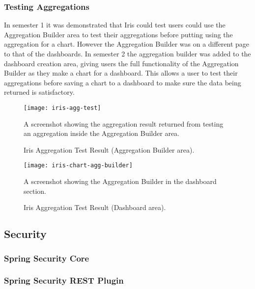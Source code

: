 \documentclass[12pt,a4paper,titlepage]{report}
\begin{document}
\subsubsection{Testing Aggregations}
In semester 1 it was demonstrated that Iris could test users could use the Aggregation Builder area to test their aggregations before putting using the aggregation for a chart. However the Aggregation Builder was on a different page to that of the dashboards. In semester 2 the aggregation builder was added to the dashboard creation area, giving users the full functionality of the Aggregation Builder as they make a chart for a dashboard. This allows a user to test their aggregations before saving a chart to a dashboard to make sure the data being returned is satisfactory.

\begin{figure}[H]
\begin{tcolorbox}
\begin{center}
\texttt{[image: iris-agg-test]}
\end{center}
A screenshot showing the aggregation result returned from testing an aggregation inside the Aggregation Builder area.
\end{tcolorbox}
\caption{Iris Aggregation Test Result (Aggregation Builder area).}
\end{figure}

\begin{figure}[H]
\begin{tcolorbox}
\begin{center}
\texttt{[image: iris-chart-agg-builder]}
\end{center}
A screenshot showing the Aggregation Builder in the dashboard section.
\end{tcolorbox}
\caption{Iris Aggregation Test Result (Dashboard area).}
\end{figure}
\subsection{Security}

\subsubsection{Spring Security Core}
\subsubsection{Spring Security REST Plugin}
\end{document}
